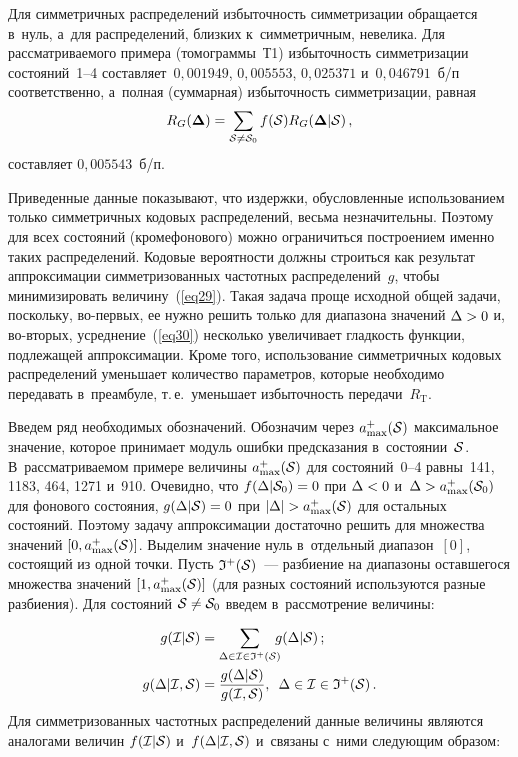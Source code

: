 \begin{multicols}{2}
Для симметричных распределений избыточность симметризации обращается в~нуль, 
а~для распределений, близких к~симметричным, невелика. Для рассматриваемого примера 
(томограммы~Т1) избыточность симметризации состояний~1--4 
составляет~$0{,}001949$, $0{,}005553$, $0{,}025371$ и~$0{,}046791$~б/п 
соответственно, а~полная (суммарная) избыточность симметризации, равная
\begin{equation}
\label{eq31}
R_G(\boldsymbol{\Delta}) = \sum\limits_{{\cal S}\neq{\cal S}_0}
f({\cal S}) R_{G}(\boldsymbol{\Delta}|{\cal S})\,,
\end{equation}
составляет $0{,}005543$~б/п.

Приведенные данные показывают, что издержки, обусловленные использованием 
только сим\-мет\-рич\-ных кодовых распределений, весьма незначительны. Поэтому 
для всех состояний (кроме\linebreak фоново\-го) можно ограничиться построением именно 
таких распределений. Кодовые вероятности должны строиться как результат 
аппроксимации симметризованных частотных распределений~$g$, 
чтобы минимизировать величину~(\ref{eq29}). Такая задача проще исходной 
общей задачи, поскольку, во-пер\-вых, ее нужно решить только для диапазона 
значений $\Delta\hm> 0$ и, во-вто\-рых, усреднение~(\ref{eq30}) несколько 
увеличивает гладкость функции, подлежащей аппроксимации. Кроме того, 
использование симметричных кодовых распределений уменьшает количество 
параметров, которые необходимо передавать в~преамбуле, т.\,е.\ 
уменьшает избыточность передачи~$R_{\mathrm{T}}$.

Введем ряд необходимых обозначений. Обозначим через $a_{\max}^+({\cal S})$ 
максимальное значение, которое принимает модуль ошибки предсказания 
в~состоянии~${\cal S}$. В~рассматриваемом примере величины $a_{\max}^+({\cal S})$ 
для состояний~0--4 равны~141, 1183, 464, 1271 и~910. 
Очевидно, что $f(\Delta|{\cal S}_0)\hm= 0$ при $\Delta\hm< 0$ 
и~$\Delta\hm> a_{\max}^+({\cal S}_0)$ для фонового состояния,  $g(\Delta|{\cal S})\hm= 
0$  при $|\Delta|\hm> a_{\max}^+({\cal S})$ для остальных состояний. 
Поэтому задачу аппроксимации достаточно решить для множества значений 
$[0,a_{\max}^+({\cal S})]$. Выделим значение нуль в~отдельный диапазон~$[0]$, 
состоящий из одной точки. Пусть ${\frak I}^+({\cal S})$~--- 
разбиение на диапазоны оставшегося множества значений $[1,a_{\max}^+({\cal S})]$ 
(для разных состояний используются разные разбиения). Для состояний 
${\cal S}\hm\neq{\cal S}_0$ введем в~рассмотрение величины:

\noindent
\begin{align*}
g({\cal I}|{\cal S}) &= \sum\limits_{\Delta\in{\cal I}\in{\frak I}^+(\cal S)} 
\hspace*{-2mm}g(\Delta|{\cal S})\,;
\\
g(\Delta|{\cal I},{\cal S})& =\fr{g(\Delta|{\cal S})}{g({\cal I},{\cal S})}, \enskip
\Delta\in{\cal I}\in{\frak I}^+(\cal S)\,.
\end{align*}
Для симметризованных частотных распределений данные величины являются аналогами 
величин $f({\cal I}|{\cal S})$ и~$f(\Delta|{\cal I},{\cal S})$ и~связаны с~ними 
сле\-ду\-ющим образом:


\end{multicols}
